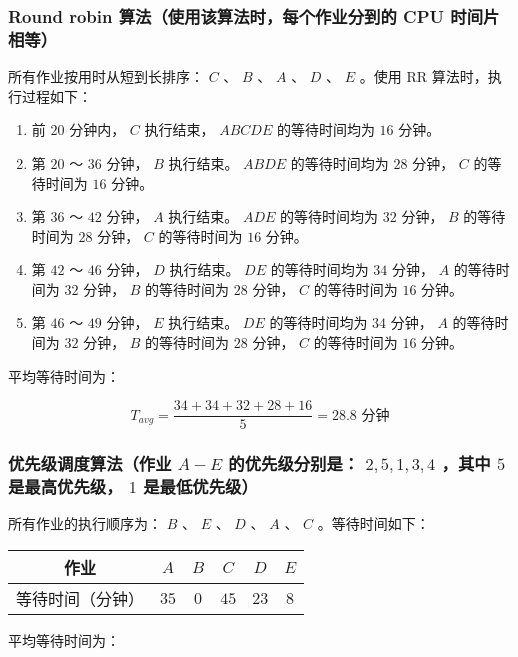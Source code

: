\subsubsection{
    Round robin 算法（使⽤该算法时，每个作业分到的 CPU 时间⽚相等）
}

所有作业按用时从短到长排序： $C$ 、 $B$ 、 $A$ 、 $D$ 、 $E$ 。使用 RR 算法时，执行过程如下：

\begin{enumerate}
    \item 前 $20$ 分钟内， $C$ 执行结束， $ABCDE$ 的等待时间均为 $16$ 分钟。
    \item 第 $20$ ～ $36$ 分钟， $B$ 执行结束。 $ABDE$ 的等待时间均为 $28$ 分钟， $C$ 的等待时间为 $16$ 分钟。
    \item 第 $36$ ～ $42$ 分钟， $A$ 执行结束。 $ADE$ 的等待时间均为 $32$ 分钟， $B$ 的等待时间为 $28$ 分钟， $C$ 的等待时间为 $16$ 分钟。
    \item 第 $42$ ～ $46$ 分钟， $D$ 执行结束。 $DE$ 的等待时间均为 $34$ 分钟， $A$ 的等待时间为 $32$ 分钟， $B$ 的等待时间为 $28$ 分钟， $C$ 的等待时间为 $16$ 分钟。
    \item 第 $46$ ～ $49$ 分钟， $E$ 执行结束。 $DE$ 的等待时间均为 $34$ 分钟， $A$ 的等待时间为 $32$ 分钟， $B$ 的等待时间为 $28$ 分钟， $C$ 的等待时间为 $16$ 分钟。
\end{enumerate}

平均等待时间为：

$$
T_{avg} =\frac{34 + 34 + 32 + 28 + 16}{5} = 28.8 \text{ 分钟}
$$

\subsubsection{
    优先级调度算法（作业 $A-E$ 的优先级分别是： $2,5,1,3,4$ ，其中 $5$ 是最⾼优先级， $1$ 是最低优先级）
}

所有作业的执行顺序为： $B$ 、 $E$ 、 $D$ 、 $A$ 、 $C$ 。等待时间如下：

\begin{table}[H]
    \centering
    \begin{tabular}{|c|c|c|c|c|c|}
    \hline
    作业 & $A$ & $B$ & $C$ & $D$ & $E$ \\ \hline
    等待时间（分钟） & $35$  & $0$  & $45$  & $23$  & $8$  \\ \hline
    \end{tabular}
\end{table}

平均等待时间为：

